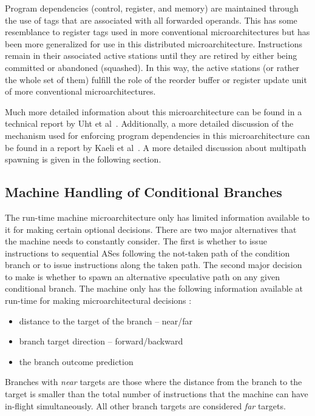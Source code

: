 \documentclass[10pt,dvips]{article}
\begin{document}
Program dependencies (control, register, and memory) are 
maintained through the use of tags that
are associated with all forwarded operands.
This has some resemblance to register tags used in more conventional 
microarchitectures but has been more generalized for use in this
distributed microarchitecture.  Instructions remain in their
associated active stations until they are retired by either being
committed or abandoned (squashed).  In this way, the active stations
(or rather the whole set of them)
fulfill the role of the reorder buffer or register update unit of more
conventional microarchitectures.

Much more detailed information about this microarchitecture
can be found in a technical report by Uht et al~\cite{Uht01}.
Additionally, a more detailed discussion of the mechanism used for
enforcing program dependencies in this microarchitecture
can be found in a report by Kaeli et al~\cite{Kaeli01}.
A more detailed discussion about multipath spawning is given
in the following section.
%
\subsection{Machine Handling of Conditional Branches}
%
The run-time machine microarchitecture only has limited information
available to it for making certain optional decisions.
There are two major alternatives that the machine needs to constantly
consider.  The first is whether to issue instructions to sequential
ASes following
the not-taken path of the condition branch or to issue instructions
along the 
taken path.  
The second major decision to make is
whether to spawn an alternative speculative path
on any given conditional branch.
The machine only has the following information
available at run-time for making microarchitectural decisions :

\begin{itemize}
\item{distance to the target of the branch -- near/far}
\item{branch target direction -- forward/backward}
\item{the branch outcome prediction}
\end{itemize}   

Branches with \textit{near} targets are those where
the distance from the branch to the target is smaller than
the total number of instructions that the machine can have
in-flight simultaneously.  All other branch targets are considered
\textit{far} targets.
\end{document}
